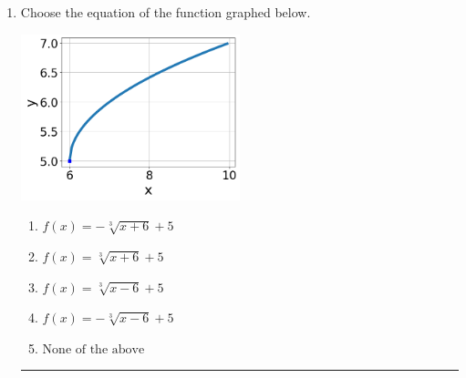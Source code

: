 \documentclass[14pt]{extbook}
\newcommand{\litem}[1]{\item#1\hspace*{-1cm}\rule{\textwidth}{0.4pt}}
\begin{document}
\begin{enumerate}
\litem{
Choose the equation of the function graphed below.
\begin{center}
    \includegraphics[width=0.5\textwidth]{../Figures/radicalGraphToEquationA.png}
\end{center}
\begin{enumerate}[label=\Alph*.]
\item \( f(x) = - \sqrt[3]{x + 6} + 5 \)
\item \( f(x) = \sqrt[3]{x + 6} + 5 \)
\item \( f(x) = \sqrt[3]{x - 6} + 5 \)
\item \( f(x) = - \sqrt[3]{x - 6} + 5 \)
\item \( \text{None of the above} \)


\end{enumerate}}
\end{enumerate}
\end{document}
